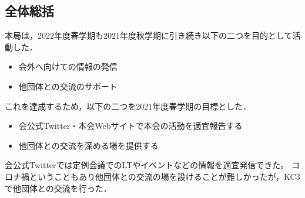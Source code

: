 \subsection*{全体総括}


本局は，2022年度春学期も2021年度秋学期に引き続き以下の二つを目的として活動した．
\begin{itemize}
\item 会外へ向けての情報の発信
\item 他団体との交流のサポート
\end{itemize}
これを達成するため，以下の二つを2021年度春学期の目標とした．
\begin{itemize}
\item 会公式Twitter・本会Webサイトで本会の活動を適宜報告する
\item 他団体との交流を深める場を提供する
\end{itemize}

会公式Twitterでは定例会議でのLTやイベントなどの情報を適宜発信できた。
コロナ禍ということもあり他団体との交流の場を設けることが難しかったが，KC3で他団体との交流を行った．
